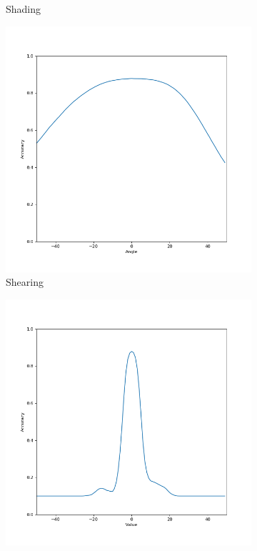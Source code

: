 \begin{figure}[htb!]
\begin{subfigure}[b]{ 0.3\textwidth}
        \caption{Shading}
        \label{fig:Rotate-misclass1}
    \end{subfigure}
    \begin{subfigure}[b]{0.3\textwidth}
        \centering
        \includegraphics[width=\textwidth]{chapters/results/CNN/Shear/acc.png}
        \caption{Shearing}
        \label{fig:Rotate-misclass0}
    \end{subfigure}
    \begin{subfigure}[b]{0.3\textwidth}
        \centering
        \includegraphics[width=\textwidth]{chapters/results/CNN/ShiftX/acc.png}

\end{subfigure}
\end{figure}
